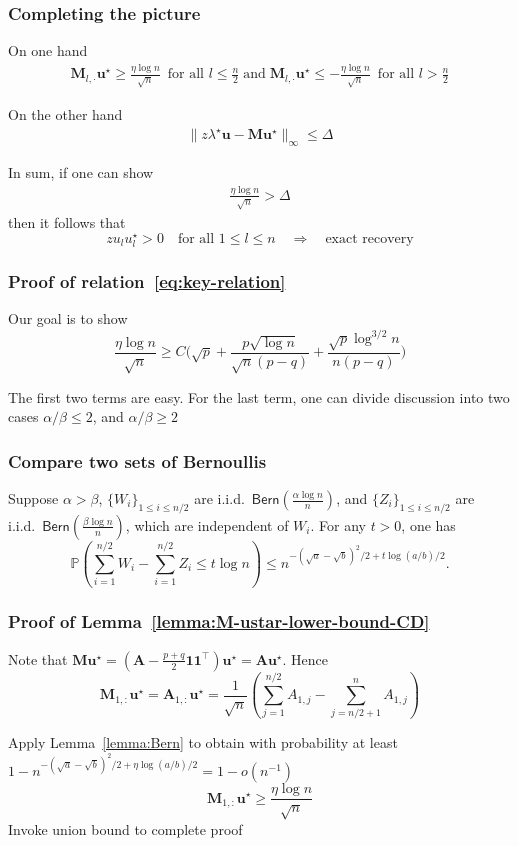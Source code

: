 \documentclass[compress,
mathserif,wide,%
]{beamer}
\begin{document}
\begin{frame}
	\frametitle{Completing the picture}
	On one hand 
	\begin{align*}
	 \bm{M}_{l,\cdot}\bm{u}^{\star}   \geq \frac{\eta \log n}{\sqrt{n}} \,\,\,\text{for all }l\leq \frac{n}{2}
	\;\text{and}\;
	   \bm{M}_{l,\cdot} \bm{u}^{\star}  
	\leq - \frac{\eta \log n}{\sqrt{n}} \,\,\, \text{for all } l > \frac{n}{2} 
\end{align*}

On the other hand	
	\begin{align*}
	\big\| z\lambda^{\star}\bm{u}-\bm{M}\bm{u}^{\star} \big\|_{\infty} \leq \Delta
	\end{align*}


In sum,  if one can show 
%
\begin{align}\label{eq:key-relation}
	\frac{\eta \log n}{\sqrt{n}}  > \Delta
\end{align}
%
then it follows that
%
\[
zu_{l} u_{l}^{\star}>0\quad\text{for all }1\leq l\leq n \quad \Longrightarrow \quad \text{exact recovery}
\]

\end{frame}

\begin{frame}
	\frametitle{Proof of relation~\eqref{eq:key-relation}}
	Our goal is to show 
	\[
	\frac{\eta \log n}{\sqrt{n}} \geq C \Big( \sqrt{p}+\frac{p\sqrt{\log n}}{\sqrt{n}(p-q)}+\frac{\sqrt{p}\log^{3/2}n}{n(p-q)} \Big)
	\]
	
	\vfill
	The first two terms are easy. For the last term, one can divide discussion into two cases $\alpha / \beta \leq 2$, and $\alpha / \beta \geq 2$
\end{frame}

\begin{frame}
	\frametitle{Compare two sets of Bernoullis}
	\begin{lemma}\label{lemma:Bern}
	Suppose $\alpha>\beta$, $\{W_{i}\}_{1\leq i\leq n/2}$ are i.i.d.~$\mathsf{Bern}(\frac{\alpha\log n}{n})$,
and $\{Z_{i}\}_{1\leq i\leq n/2}$ are i.i.d.~$\mathsf{Bern}(\frac{\beta\log n}{n})$,
which are independent of $W_{i}$. For any $t>0$, one has
\[
\mathbb{P}\left(\sum_{i=1}^{n/2}W_{i}-\sum_{i=1}^{n/2}Z_{i}\leq t\log n\right)\leq n^{-(\sqrt{a}-\sqrt{b})^{2}/2+t\log(a/b)/2}.
\]
	\end{lemma}
\end{frame}

\begin{frame}
	\frametitle{Proof of Lemma~\ref{lemma:M-ustar-lower-bound-CD}}
	Note that $\bm{M}\bm{u}^{\star} = (\bm{A} - \frac{p+q}{2}\bm{1}\bm{1}^\top)\bm{u}^{\star} = \bm{A} \bm{u}^\star$. Hence
\[
\bm{M}_{1,:}\bm{u}^{\star}=\bm{A}_{1,:}\bm{u}^{\star}=\frac{1}{\sqrt{n}}\left(\sum_{j=1}^{n/2}A_{1,j}-\sum_{j=n/2+1}^{n}A_{1,j}\right)
\]

\vfill
Apply Lemma~\ref{lemma:Bern} to obtain with probability at least $1- n^{-(\sqrt{a}-\sqrt{b})^{2}/2+\eta\log(a/b)/2} = 1 - o(n^{-1})$
\[
\bm{M}_{1,:}\bm{u}^{\star} \geq \frac{\eta \log n}{\sqrt{n}}
\]
Invoke union bound to complete proof
\end{frame}
\end{document}
